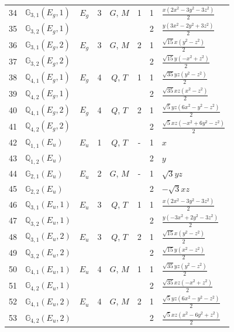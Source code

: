 \documentclass[fleqn,10pt,landscape]{jsarticle}
\begin{document}
\begin{longtable}[l]{clcccccl}
34 & $\mathbb{G}_{3,1}(E_{g},1)$ & $E_{g}$ & 3 & $G$, $M$ & 1 & 1 & $\frac{x \left(2 x^{2} - 3 y^{2} - 3 z^{2}\right)}{2}$ \\
35 & $\mathbb{G}_{3,2}(E_{g},1)$ &  &  &  &  & 2 & $\frac{y \left(3 x^{2} - 2 y^{2} + 3 z^{2}\right)}{2}$ \\ \hline
36 & $\mathbb{G}_{3,1}(E_{g},2)$ & $E_{g}$ & 3 & $G$, $M$ & 2 & 1 & $\frac{\sqrt{15} x \left(y^{2} - z^{2}\right)}{2}$ \\
37 & $\mathbb{G}_{3,2}(E_{g},2)$ &  &  &  &  & 2 & $\frac{\sqrt{15} y \left(- x^{2} + z^{2}\right)}{2}$ \\ \hline
38 & $\mathbb{Q}_{4,1}(E_{g},1)$ & $E_{g}$ & 4 & $Q$, $T$ & 1 & 1 & $\frac{\sqrt{35} y z \left(y^{2} - z^{2}\right)}{2}$ \\
39 & $\mathbb{Q}_{4,2}(E_{g},1)$ &  &  &  &  & 2 & $\frac{\sqrt{35} x z \left(x^{2} - z^{2}\right)}{2}$ \\ \hline
40 & $\mathbb{Q}_{4,1}(E_{g},2)$ & $E_{g}$ & 4 & $Q$, $T$ & 2 & 1 & $\frac{\sqrt{5} y z \left(6 x^{2} - y^{2} - z^{2}\right)}{2}$ \\
41 & $\mathbb{Q}_{4,2}(E_{g},2)$ &  &  &  &  & 2 & $\frac{\sqrt{5} x z \left(- x^{2} + 6 y^{2} - z^{2}\right)}{2}$ \\ \hline
42 & $\mathbb{Q}_{1,1}(E_{u})$ & $E_{u}$ & 1 & $Q$, $T$ & - & 1 & $x$ \\
43 & $\mathbb{Q}_{1,2}(E_{u})$ &  &  &  &  & 2 & $y$ \\ \hline
44 & $\mathbb{G}_{2,1}(E_{u})$ & $E_{u}$ & 2 & $G$, $M$ & - & 1 & $\sqrt{3} y z$ \\
45 & $\mathbb{G}_{2,2}(E_{u})$ &  &  &  &  & 2 & $- \sqrt{3} x z$ \\ \hline
46 & $\mathbb{Q}_{3,1}(E_{u},1)$ & $E_{u}$ & 3 & $Q$, $T$ & 1 & 1 & $\frac{x \left(2 x^{2} - 3 y^{2} - 3 z^{2}\right)}{2}$ \\
47 & $\mathbb{Q}_{3,2}(E_{u},1)$ &  &  &  &  & 2 & $\frac{y \left(- 3 x^{2} + 2 y^{2} - 3 z^{2}\right)}{2}$ \\ \hline
48 & $\mathbb{Q}_{3,1}(E_{u},2)$ & $E_{u}$ & 3 & $Q$, $T$ & 2 & 1 & $\frac{\sqrt{15} x \left(y^{2} - z^{2}\right)}{2}$ \\
49 & $\mathbb{Q}_{3,2}(E_{u},2)$ &  &  &  &  & 2 & $\frac{\sqrt{15} y \left(x^{2} - z^{2}\right)}{2}$ \\ \hline
50 & $\mathbb{G}_{4,1}(E_{u},1)$ & $E_{u}$ & 4 & $G$, $M$ & 1 & 1 & $\frac{\sqrt{35} y z \left(y^{2} - z^{2}\right)}{2}$ \\
51 & $\mathbb{G}_{4,2}(E_{u},1)$ &  &  &  &  & 2 & $\frac{\sqrt{35} x z \left(- x^{2} + z^{2}\right)}{2}$ \\ \hline
52 & $\mathbb{G}_{4,1}(E_{u},2)$ & $E_{u}$ & 4 & $G$, $M$ & 2 & 1 & $\frac{\sqrt{5} y z \left(6 x^{2} - y^{2} - z^{2}\right)}{2}$ \\
53 & $\mathbb{G}_{4,2}(E_{u},2)$ &  &  &  &  & 2 & $\frac{\sqrt{5} x z \left(x^{2} - 6 y^{2} + z^{2}\right)}{2}$ \\
\end{longtable}
\end{document}
